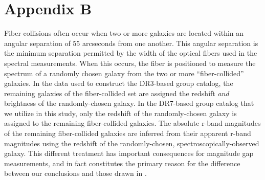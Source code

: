 \documentclass[usenatbib,usegraphicx,letterpaper]{mn2e}
\newcommand{\vl}{V_{\mathrm{L}}}
\newcommand{\mr}{M_{\mathrm{r}}}
\newcommand{\lthresh}{M^{\mathrm{thr}}_{\mathrm{r}}}
\newcommand{\linit}{M^{\mathrm{init}}_{\mathrm{r}}}
\newcommand{\lscatter}{M^{\mathrm{scatter}}_{\mathrm{r}}}
\begin{document}


\section*{Appendix B}
\label{section:appendixb}

Fiber collisions often occur when two or 
more galaxies are located within an angular separation of $55$
arcseconds from one another.  This angular separation is the 
minimum separation permitted by the width of the optical fibers used 
in the spectral measurements. When this occurs,
the fiber is positioned to measure the spectrum of a randomly chosen
galaxy from the two or more ``fiber-collided'' galaxies. In the data used 
to construct the DR3-based group catalog, the remaining galaxies of the fiber-collided set are 
assigned the redshift {\em and} brightness of the randomly-chosen galaxy.  
In the DR7-based group catalog that we utilize in this study, 
only the redshift of the randomly-chosen galaxy is assigned to the
remaining fiber-collided galaxies.  The absolute r-band magnitudes of 
the remaining fiber-collided galaxies are inferred from their apparent 
r-band magnitudes using the redshift of the randomly-chosen, 
spectroscopically-observed galaxy. This different treatment has important
 consequences for magnitude gap measurements, and in fact constitutes the primary reason for the difference between our conclusions and those drawn in \citet{paranjape_sheth11}. 
 
\end{document}
